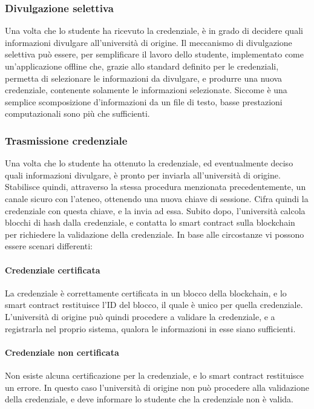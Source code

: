 \documentclass[a4paper,12pt]{article}
\begin{document}
\subsubsection{Divulgazione selettiva}
Una volta che lo studente ha ricevuto la credenziale, è in grado di decidere quali informazioni divulgare all'università di origine. Il meccanismo di divulgazione selettiva può essere, per semplificare il lavoro dello studente, implementato come un'applicazione offline che, grazie allo standard definito per le credenziali, permetta di selezionare le informazioni da divulgare, e produrre una nuova credenziale, contenente solamente le informazioni selezionate.
\newline Siccome è una semplice scomposizione d'informazioni da un file di testo, basse prestazioni computazionali sono più che sufficienti.
\subsubsection{Trasmissione credenziale}
Una volta che lo studente ha ottenuto la credenziale, ed eventualmente deciso quali informazioni divulgare, è pronto per inviarla all'università di origine. Stabilisce quindi, attraverso la stessa procedura menzionata precedentemente, un canale sicuro con l'ateneo, ottenendo una nuova chiave di sessione. Cifra quindi la credenziale con questa chiave, e la invia ad essa. Subito dopo, l'università calcola blocchi di hash dalla credenziale, e contatta lo smart contract sulla blockchain per richiedere la validazione della credenziale.
\newline In base alle circostanze vi possono essere scenari differenti:
\paragraph{Credenziale certificata} La credenziale è correttamente certificata in un blocco della blockchain, e lo smart contract restituisce l'ID del blocco, il quale è unico per quella credenziale. L'università di origine può quindi procedere a validare la credenziale, e a registrarla nel proprio sistema, qualora le informazioni in esse siano sufficienti.
\paragraph{Credenziale non certificata} Non esiste alcuna certificazione per la credenziale, e lo smart contract restituisce un errore. In questo caso l'università di origine non può procedere alla validazione della credenziale, e deve informare lo studente che la credenziale non è valida.
\end{document}
